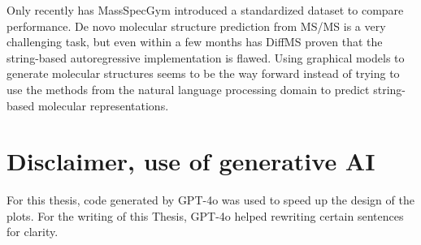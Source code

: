 Only recently has MassSpecGym introduced a standardized dataset to compare performance. De novo molecular structure prediction from \ac{MS/MS} is a very challenging task,
but even within a few months has DiffMS proven that the string-based autoregressive implementation is flawed.
Using graphical models to generate molecular structures seems to be the way forward instead of trying to use the methods from the natural language processing domain to predict string-based molecular representations.

\section*{Disclaimer, use of generative AI}

For this thesis, code generated by GPT-4o was used to speed up the design of the plots.
For the writing of this Thesis, GPT-4o helped rewriting certain sentences for clarity.